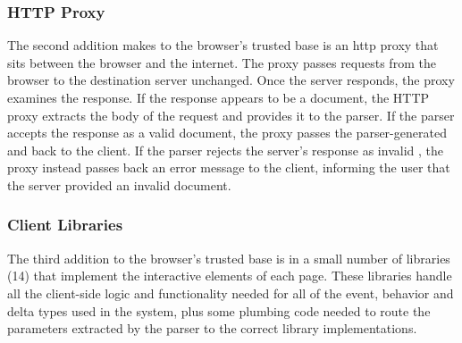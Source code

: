 \subsubsection{HTTP Proxy}
\label{future-web:implementation:proxy}
The second addition \CDF makes to the browser's trusted base is an \gls{http}
proxy that sits between the browser and the internet.  The proxy passes
requests from the browser to the destination server unchanged.  Once the server
responds, the proxy examines the response.  If the response appears to be a
\CDF document, the HTTP proxy extracts the body of the request and provides it
to the parser.  If the parser accepts the response as a valid \CDF document,
the proxy passes the parser-generated \HTML and \JS back to the client.  If the
parser rejects the server's response as invalid \CDF, the proxy instead passes
back an error message to the client, informing the user that the server
provided an invalid document.


\subsubsection{Client \JS Libraries}
\label{future-web:implementation:client-js}
The third addition to the browser's trusted base is in a small number of \JS
libraries (14) that implement the interactive elements of each page.  These
libraries handle all the client-side logic and functionality needed for all of
the event, behavior and delta types used in the system, plus some plumbing code
needed to route the parameters extracted by the parser to the correct library
implementations.
